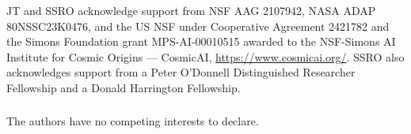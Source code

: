 \documentclass[runningheads]{llncs}
\begin{document}
\begin{credits}
\subsubsection{\ackname} JT and SSRO acknowledge support from NSF AAG 2107942, NASA ADAP 80NSSC23K0476, and the US NSF under Cooperative Agreement 2421782 and the Simons Foundation grant MPS-AI-00010515 awarded to the NSF-Simons AI Institute for Cosmic Origins --- CosmicAI, \url{https://www.cosmicai.org/}. SSRO also acknowledges support from a Peter O'Donnell Distinguished Researcher Fellowship and a Donald Harrington Fellowship.
\subsubsection{\discintname} The authors have no competing interests to declare.
\end{credits}



\end{document}
